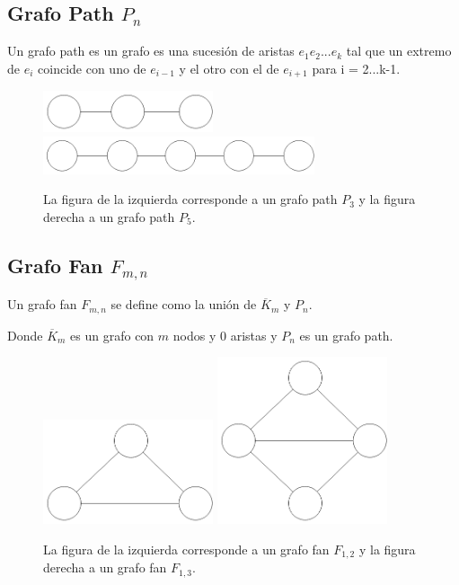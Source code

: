 \subsection{Grafo Path $P_n$}
Un grafo path es un grafo es una sucesión de aristas $e_1e_2$...$e_k$ tal que un extremo de $e_i$ coincide con uno de $e_{i-1}$ y el otro con el de $e_{i+1}$ para i = 2...k-1.

\begin{figure}[H]
\centering
\includegraphics[width=50mm]{P3.png}
\includegraphics[width=80mm]{P5.png}
\caption{La figura de la izquierda corresponde a un grafo path $P_3$ y la figura derecha a un grafo path $P_5$.}
\label{overflow}
\end{figure}

\subsection{Grafo Fan $F_{m,n}$}
Un grafo fan $F_{m,n}$ se define como la unión de $\overline{K}_m$ y $P_n$.

Donde $\overline{K}_m$ es un grafo con $m$ nodos y 0 aristas y $P_n$ es un grafo path.

\begin{figure}[H]
\centering
\includegraphics[width=50mm]{F1_2.png}
\includegraphics[width=50mm]{F1_3.png}
\caption{La figura de la izquierda corresponde a un grafo fan $F_{1,2}$ y la figura derecha a un grafo fan $F_{1,3}$.}
\label{overflow}
\end{figure}

